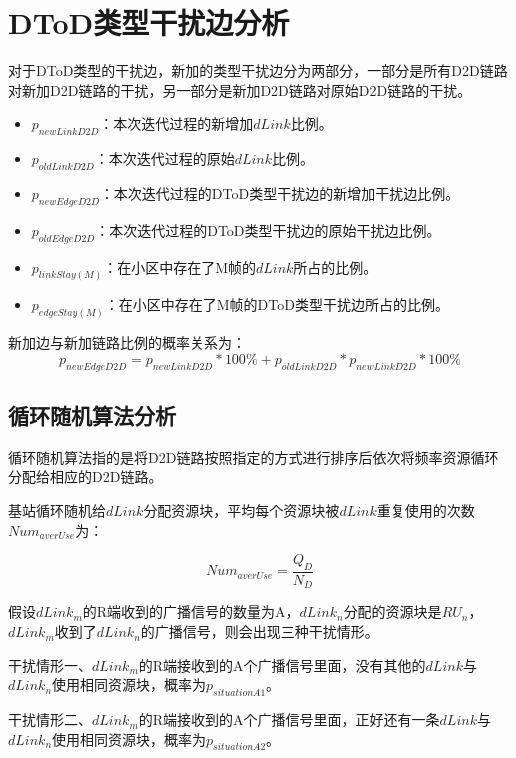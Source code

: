 \documentclass[figurelist,tablelist,algorithmlist,nomlist,masters]{seuthesix}
\begin{document}
	
	\section{DToD类型干扰边分析}
	对于DToD类型的干扰边，新加的类型干扰边分为两部分，一部分是所有D2D链路对新加D2D链路的干扰，另一部分是新加D2D链路对原始D2D链路的干扰。
	\begin{itemize}
		\item ${p_{newLinkD2D}}$：本次迭代过程的新增加$dLink$比例。
		\item ${p_{oldLinkD2D}}$：本次迭代过程的原始$dLink$比例。
		\item ${p_{newEdgeD2D}}$：本次迭代过程的DToD类型干扰边的新增加干扰边比例。
		\item ${p_{oldEdgeD2D}}$：本次迭代过程的DToD类型干扰边的原始干扰边比例。
		\item ${p_{linkStay(M)}}$：在小区中存在了M帧的$dLink$所占的比例。
		\item ${p_{edgeStay(M)}}$：在小区中存在了M帧的DToD类型干扰边所占的比例。
	\end{itemize}
	
	新加边与新加链路比例的概率关系为：
	\begin{equation}\label{eq3.1}
	{p_{newEdgeD2D}} = {p_{newLinkD2D}}*100\%  + {p_{oldLinkD2D}}*{p_{newLinkD2D}}*100\% 
	\end{equation}
	
	\subsection{循环随机算法分析}
	
	循环随机算法指的是将D2D链路按照指定的方式进行排序后依次将频率资源循环分配给相应的D2D链路。
	
	基站循环随机给$dLink$分配资源块，平均每个资源块被$dLink$重复使用的次数$Nu{m_{averUse}}$为： 
	
	\begin{equation}\label{eq3.1}
	Nu{m_{averUse}} = \frac{{Q_D}}{{N_D}}
	\end{equation}
	
	假设$dLink_m$的R端收到的广播信号的数量为A，$dLink_n$分配的资源块是$RU_n$，$dLink_m$收到了$dLink_n$的广播信号，则会出现三种干扰情形。
	
	干扰情形一、$dLink_m$的R端接收到的A个广播信号里面，没有其他的$dLink$与$dLink_n$使用相同资源块，概率为${p_{situationA1}}$。
	
	干扰情形二、$dLink_m$的R端接收到的A个广播信号里面，正好还有一条$dLink$与$dLink_n$使用相同资源块，概率为${p_{situationA2}}$。
	
\end{document}
